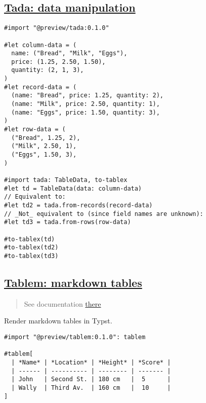 \pandocbounded{}

\subsection{\texorpdfstring{\hyperref[tada-data-manipulation]{Tada: data
manipulation}}{Tada: data manipulation}}\label{tada-data-manipulation}

\begin{verbatim}
#import "@preview/tada:0.1.0"

#let column-data = (
  name: ("Bread", "Milk", "Eggs"),
  price: (1.25, 2.50, 1.50),
  quantity: (2, 1, 3),
)
#let record-data = (
  (name: "Bread", price: 1.25, quantity: 2),
  (name: "Milk", price: 2.50, quantity: 1),
  (name: "Eggs", price: 1.50, quantity: 3),
)
#let row-data = (
  ("Bread", 1.25, 2),
  ("Milk", 2.50, 1),
  ("Eggs", 1.50, 3),
)

#import tada: TableData, to-tablex
#let td = TableData(data: column-data)
// Equivalent to:
#let td2 = tada.from-records(record-data)
// _Not_ equivalent to (since field names are unknown):
#let td3 = tada.from-rows(row-data)

#to-tablex(td)
#to-tablex(td2)
#to-tablex(td3)
\end{verbatim}

\pandocbounded{}

\subsection{\texorpdfstring{\hyperref[tablem-markdown-tables]{Tablem:
markdown
tables}}{Tablem: markdown tables}}\label{tablem-markdown-tables}

\begin{quote}
See documentation \href{https://github.com/OrangeX4/typst-tablem}{there}
\end{quote}

Render markdown tables in Typst.

\begin{verbatim}
#import "@preview/tablem:0.1.0": tablem

#tablem[
  | *Name* | *Location* | *Height* | *Score* |
  | ------ | ---------- | -------- | ------- |
  | John   | Second St. | 180 cm   |  5      |
  | Wally  | Third Av.  | 160 cm   |  10     |
]
\end{verbatim}

